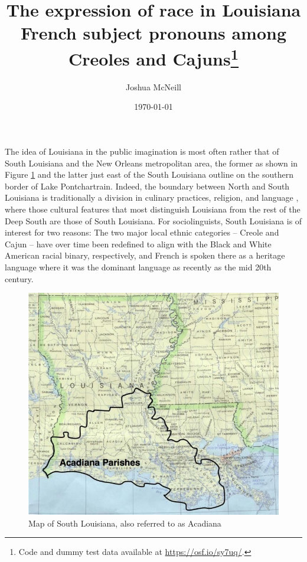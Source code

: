 \documentclass{article}\usepackage[]{graphicx}\usepackage[]{xcolor}
\title{The expression of race in Louisiana French subject pronouns among Creoles and Cajuns\footnote{
    Code and dummy test data available at \url{https://osf.io/sy7uq/}.
  }}
\author{Joshua McNeill}
\date{\today}
\begin{document}
  \maketitle
  \doublespacing
  The idea of Louisiana in the public imagination is most often rather that of South Louisiana and the New Orleans metropolitan area, the former as shown in Figure \ref{fig:south_la} and the latter just east of the South Louisiana outline on the southern border of Lake Pontchartrain.
  Indeed, the boundary between North and South Louisiana is traditionally a division in culinary practices, religion, and language \parencite[p.~309]{trepanier_french_1988}, where those cultural features that most distinguish Louisiana from the rest of the Deep South are those of South Louisiana.
  For sociolinguists, South Louisiana is of interest for two reasons: The two major local ethnic categories -- Creole and Cajun -- have over time been redefined to align with the Black and White American racial binary, respectively, and French is spoken there as a heritage language where it was the dominant language as recently as the mid 20th century.

  \begin{figure}[tbhp]
    \centering
    \caption{Map of South Louisiana, also referred to as Acadiana}
    \label{fig:south_la}
    \includegraphics[scale=0.35]{acadiana.jpg}
  \end{figure}
\end{document}
